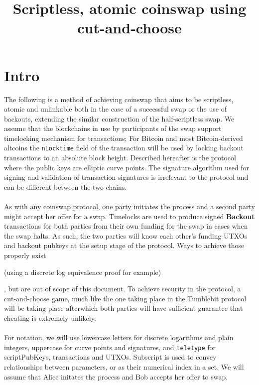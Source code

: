 \documentclass[12pt,a4paper]{article}
\title{Scriptless, atomic coinswap using cut-and-choose}
\date{\begin{tiny}version 0.1-broken \\
See \texttt{https://github.com/fivepiece/coinswap\_cnc/blob/master/README.txt}\end{tiny}}
\begin{document}
\maketitle
\section{Intro}
The following is a method of achieving coinswap\cite{gmaxwell} that aims to be scriptless, atomic and unlinkable both in the case of a successful swap or the use of backouts, extending the similar construction of the half-scriptless swap\cite{hss}.  We assume that the blockchains in use by participants of the swap support timelocking mechanism for transactions; For Bitcoin and most Bitcoin-derived altcoins the \texttt{nLocktime} field of the transaction will be used by locking backout transactions to an absolute block height.  Described hereafter is the protocol where the public keys are elliptic curve points.  The signature algorithm used for signing and validation of transaction signatures is irrelevant to the protocol and can be different between the two chains.
\\
\\
As with any coinswap protocol, one party initiates the process and a second party might accept her offer for a swap.  Timelocks are used to produce signed \textbf{Backout} transactions for both parties from their own funding for the swap in cases when the swap halts.  As such, the two parties will know each other's funding UTXOs and backout pubkeys at the setup stage of the protocol.  Ways to achieve those properly exist \begin{tiny}(using a discrete log equivalence proof for example)\end{tiny}, but are out of scope of this document.  To achieve security in the protocol, a cut-and-choose \cite{cnc} game, much like the one taking place in the Tumblebit \cite{tumblebit} protocol will be taking place afterwhich both parties will have sufficient guarantee that cheating is extremely unlikely.
\\
\\
For notation, we will use lowercase letters for discrete logarithms and plain integers, uppercase for curve points and signatures, and \texttt{teletype} for scriptPubKeys, transactions and UTXOs.  Subscript is used to convey relationships between parameters, or as their numerical index in a set.
We will assume that Alice initates the process and Bob accepts her offer to swap.
\end{document}
